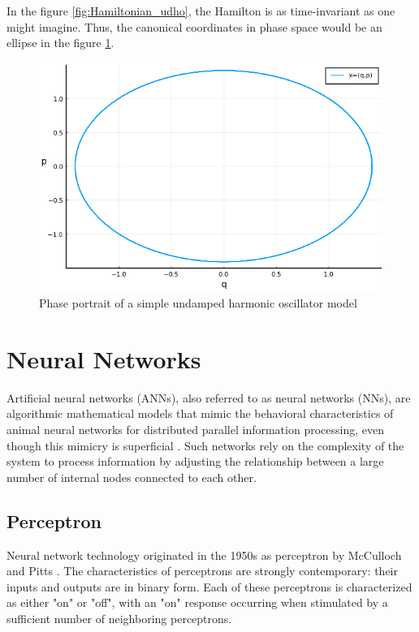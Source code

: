 \documentclass[
	parskip, 			   %
	twoside, 			   %
	DIV=14, 			   %
	BCOR=15.0mm, 		   %
	headsepline, 		   %
	open=right, 		   %
	captions=tableheading, %
	bibliography=totoc,    %
	numbers=noenddot       %
]{scrreprt}
\begin{document}
In the figure \ref{fig:Hamiltonian_udho}, the Hamilton is as time-invariant as one might imagine. Thus, the canonical coordinates in phase space would be an ellipse in the figure \ref{fig:phase_portrait_udho}.

\begin{figure}[h!]
    \centering
    \includegraphics[scale=0.8]{figures/phase_portrait_canonical_coordinates.png}
    \caption{Phase portrait of a simple undamped harmonic oscillator model}
    \label{fig:phase_portrait_udho}
\end{figure}


\clearpage
\chapter{Neural Networks}
Artificial neural networks (ANNs), also referred to as neural networks (NNs), are algorithmic mathematical models that mimic the behavioral characteristics of animal neural networks for distributed parallel information processing, even though this mimicry is superficial \cite{russell2010artificial}. Such networks rely on the complexity of the system to process information by adjusting the relationship between a large number of internal nodes connected to each other.

\section{Perceptron}
Neural network technology originated in the 1950s as perceptron by McCulloch and Pitts \cite{mcculloch1943logical}. The characteristics of perceptrons are strongly contemporary: their inputs and outputs are in binary form. Each of these perceptrons is characterized as either "on" or "off", with an "on" response occurring when stimulated by a sufficient number of neighboring perceptrons.
\end{document}

